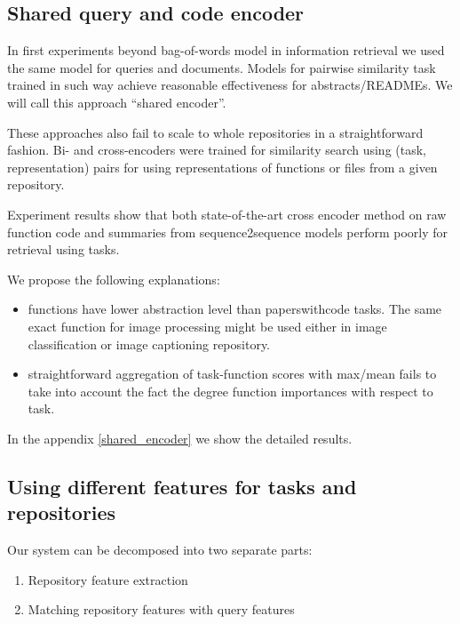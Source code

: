\documentclass[longabstract,mgr,english]{iithesis}
\begin{document}
\label{general_ideas}

\subsection{Shared query and code encoder}
In first experiments beyond bag-of-words model in information retrieval we used the same model for queries and
documents. Models for pairwise similarity task trained in such way achieve reasonable effectiveness
for abstracts/READMEs. We will call this approach ``shared encoder''.

These approaches also fail to scale to whole repositories in a straightforward
fashion. Bi- and cross-encoders  were trained for similarity search using (task, representation) pairs for
using representations of functions or files from a given repository. 

Experiment results show that both state-of-the-art cross encoder method on raw function
code and summaries from sequence2sequence models perform poorly for retrieval
using tasks.

We propose the following explanations:

\begin{itemize}
\item functions have lower abstraction level than paperswithcode tasks. The same
  exact function for image processing might be used either in image
  classification or image captioning repository.
\item straightforward aggregation of task-function scores with max/mean fails to
  take into account the fact the degree function importances with respect to task. 
\end{itemize}

In the appendix \ref{shared_encoder} we show the detailed results.

\subsection{Using different features for tasks and repositories}

Our system can be decomposed into two separate parts:

\begin{enumerate}

\item Repository feature extraction

\item Matching repository features with query features

\end{enumerate}
\end{document}
